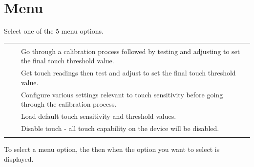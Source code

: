 \section{Menu}  \label{Touch - Menu}

Select one of the \num{5} menu options.

\begin{table}[H]
\begin{tabu} { X[1,c,m] | X[1,c,m] | X[4,l,m] }
  \thrule
   &  &  \\ \mrule
   &  & Go through a calibration process followed by testing
    and adjusting to set the final touch threshold value. \\ 
   &  & Get touch readings 
    then test and adjust to set the final touch threshold value. \\ 
   &  & Configure various settings relevant to touch
    sensitivity before going through the calibration process. \\ 
   &  & Load default touch sensitivity and
    threshold values. \\ 
   &  & Disable touch - all touch capability on the
    device will be disabled. \\
  \bhrule
\end{tabu}
\end{table}

To select a menu option,  the  then  when the option you
want to select is displayed.


